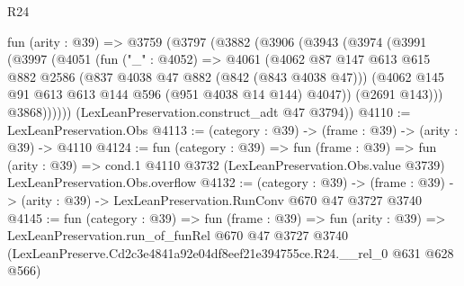 \begin{lexlean}{R24}
\begin{coremodule}
  fun (arity : @39) =>
  @3759
    (@3797
      (@3882
        (@3906
          (@3943
            (@3974
              (@3991
                (@3997
                  (@4051
                    (fun ("_" : @4052) =>
                    @4061
                      (@4062
                        @87
                        @147
                        @613
                        @615
                        @882
                        @2586
                        (@837 @4038 @47 @882 (@842 (@843 @4038 @47)))
                        (@4062 @145 @91 @613 @613 @144 @596 (@951 @4038 @14 @144) @4047))
                      (@2691 @143)))
                  @3868))))))
      (LexLeanPreservation.construct_adt @47 @3794))
@4110 := LexLeanPreservation.Obs
@4113 := (category : @39) -> (frame : @39) -> (arity : @39) -> @4110
@4124 := fun (category : @39) =>
  fun (frame : @39) =>
  fun (arity : @39) =>
  cond.{1} @4110 @3732 (LexLeanPreservation.Obs.value @3739) LexLeanPreservation.Obs.overflow
@4132 := (category : @39) ->
  (frame : @39) -> (arity : @39) -> LexLeanPreservation.RunConv @670 @47 @3727 @3740
@4145 := fun (category : @39) =>
  fun (frame : @39) =>
  fun (arity : @39) =>
  LexLeanPreservation.run_of_funRel
    @670
    @47
    @3727
    @3740
    (LexLeanPreserve.Cd2c3e4841a92e04df8eef21e394755ce.R24.__rel_0 @631 @628 @566)
\end{coremodule}
\end{lexlean}
